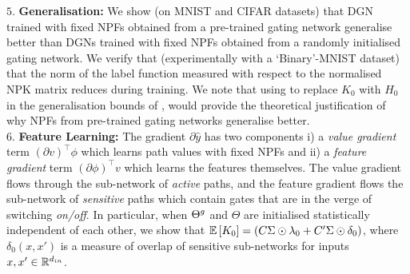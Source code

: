 $5.$ \textbf{Generalisation:}  We show (on MNIST and CIFAR datasets) that DGN trained with fixed NPFs obtained from a pre-trained gating network generalise better than DGNs trained with fixed NPFs obtained from a randomly initialised gating network. We verify that (experimentally with a `Binary'-MNIST dataset) that the norm of the label function measured with respect to the normalised NPK matrix reduces during training. We note that using  to replace $K_0$ with $H_0$ in the generalisation bounds of \cite{cao2019generalization}, would provide the theoretical justification of why NPFs from pre-trained gating networks generalise better.\\
$6.$ \textbf{Feature Learning:} The gradient $\partial \hat{y}$ has two components i) a \emph{value gradient} term $(\partial v)^\top \phi$ which learns path values with fixed NPFs and ii) a \emph{feature gradient} term $(\partial \phi)^\top v$ which learns the features themselves. The value gradient flows through the sub-network of \emph{active} paths, and the feature gradient flows the sub-network of \emph{sensitive} paths which contain gates that are in the verge of switching \emph{on/off}. In particular, when ${\Theta}^g$ and $\Theta$ are initialised statistically independent of each other, we show that $\mathbb{E}\left[K_0\right]=(C\Sigma\odot\lambda_0+C'\Sigma\odot\delta_0)$, where $\delta_0(x,x')$ is a measure of overlap of sensitive sub-networks for inputs $x,x'\in\mathbb{R}^{d_{in}}$.

